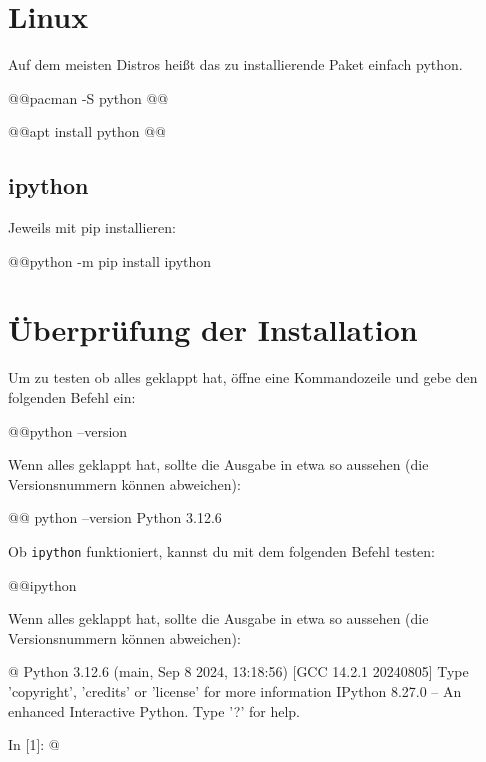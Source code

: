 \newpage
\section*{Linux}
Auf dem meisten Distros heißt das zu installierende Paket einfach {\ttfamily python}.
\begin{commandshell}[][minted language=text]
    @\shellprefix{}@pacman -S python @@
\end{commandshell}

\begin{commandshell}[][minted language=text]
    @\shellprefix{}@apt install python @@
\end{commandshell}

\subsection*{ipython}
Jeweils mit pip installieren:
\begin{commandshell}[][minted language=text]
    @\shellprefix{}@python -m pip install ipython
\end{commandshell}

\section*{Überprüfung der Installation}\label{sec:check}
Um zu testen ob alles geklappt hat, öffne eine Kommandozeile und gebe den folgenden Befehl ein:
\begin{commandshell}
    @\shellprefix{}@python --version
\end{commandshell}

Wenn alles geklappt hat, sollte die Ausgabe in etwa so aussehen (die Versionsnummern können abweichen):
\begin{commandshell}[][]
    @\shellprefix{}@ python --version
    Python 3.12.6
\end{commandshell}

Ob \texttt{ipython} funktioniert, kannst du mit dem folgenden Befehl testen:
\begin{commandshell}
    @\shellprefix{}@ipython
\end{commandshell}
Wenn alles geklappt hat, sollte die Ausgabe in etwa so aussehen (die Versionsnummern können abweichen):
\begin{commandshell}[][minted language=text]
    @\shellprefix@ipython
    Python 3.12.6 (main, Sep  8 2024, 13:18:56) [GCC 14.2.1 20240805]
    Type 'copyright', 'credits' or 'license' for more information
    IPython 8.27.0 -- An enhanced Interactive Python. Type '?' for help.

    In [1]: @\shellcursor@
\end{commandshell}


